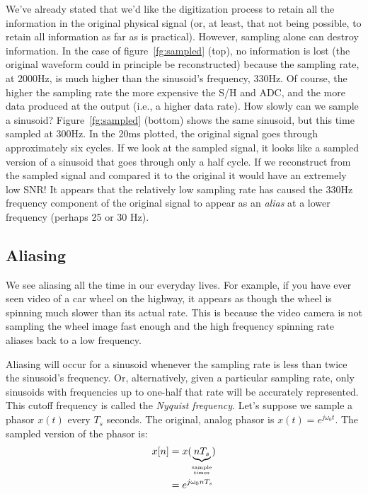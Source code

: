 
We've already stated that we'd like the digitization process to retain
all the information in the original physical signal (or, at least,
that not being possible, to retain all information as far as is practical).
However, sampling alone can destroy information. In the case of
figure~\ref{fg:sampled} (top), no information is lost (the original
waveform could in principle be reconstructed) because the sampling
rate, at 2000Hz, is much higher than the sinusoid's frequency, 330Hz.
Of course, the higher the sampling rate the more expensive the S/H and
ADC, and the more data produced at the output (i.e., a
higher data rate).  How slowly can we sample a sinusoid?
Figure~\ref{fg:sampled} (bottom) shows the same sinusoid, but this time sampled at 300Hz. In the 20ms
plotted, the original signal goes through approximately six cycles. If
we look at the sampled signal, it looks like a sampled version of a
sinusoid that goes through only a half cycle. If we reconstruct from the sampled signal and compared it to the original it would have an extremely low SNR! It
appears that the relatively low sampling rate has caused the 330Hz
frequency component of the original signal to appear as an
\emph{alias} at a lower frequency (perhaps 25 or 30 Hz).  

\subsection{Aliasing}
We see aliasing all the time in our everyday lives. For example, if you have ever seen video of a car wheel on the highway, it appears as though the wheel is spinning much slower than its actual rate. This is because the video camera is not sampling the wheel image fast enough and the high frequency spinning rate aliases back to a low frequency. 

Aliasing will occur for a sinusoid whenever the sampling rate is
less than twice the sinusoid's frequency.  Or, alternatively, given a
particular sampling rate, only sinusoids with frequencies up to
one-half that rate will be accurately represented. This cutoff
frequency is called the \emph{Nyquist frequency}. Let's suppose we
sample a phasor $x(t)$ every $T_s$ seconds. The original,
analog phasor is $x(t) = e^{j\omega_0 t}$. The sampled version of
the phasor is:
\begin{align}
x[n] & = x(\underbrace{n T_s}_{\stackrel{\text{sample}}{_\text{times}}}) \notag\\
     & = e^{j\omega_0 nT_s} \label{eq:samp-phasor}
\end{align}

